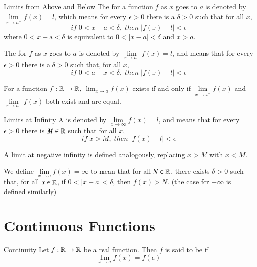\documentclass[12pt]{report}
\begin{document}
\begin{defn}{Limits from Above and Below}{}
    The  for a function $f$ as $x$ goes to $a$ is denoted by $\lim\limits_{x\rightarrow a^+}f(x) = l$, which means for every $\epsilon > 0$ there is a $\delta > 0$ such that for all $x$, $$if\;0 < x-a < \delta,\;then\;|f(x) - l|< \epsilon$$
    where $0 < x-a < \delta$ is equivalent to $0 < |x-a| < \delta$ and $x > a$.

    The  for $f$ as $x$ goes to $a$ is denoted by $\lim\limits_{x\rightarrow a^-}f(x) = l$, and means that for every $\epsilon > 0$ there is a $\delta > 0$ such that, for all $x$, $$if\;0 < a-x < \delta,\;then\;|f(x) - l| < \epsilon$$
\end{defn}


\begin{rmk}{}{}
    For a function $f:\mathbb R\rightarrow \mathbb R$, $\lim_{x\rightarrow a}f(x)$ exists if and only if $\lim\limits_{x\rightarrow a^+}f(x)$ and $\lim\limits_{x\rightarrow a^-}f(x)$ both exist and are equal.
\end{rmk}


\begin{defn}{Limits at Infinity}{}
    A  is denoted by $\lim\limits_{x\rightarrow \infty}f(x) = l$, and means that for every $\epsilon > 0$ there is $M \in \mathbb R$ such that for all $x$, $$if\;x>M,\;then\;|f(x) - l| < \epsilon$$

    A limit at negative infinity is defined analogously, replacing $x> M$ with $x < M$.
\end{defn}


\begin{defn}{}{}
    We define $\lim\limits_{x\rightarrow a}f(x) = \infty$ to mean that for all $N \in \mathbb R$, there exists $\delta > 0$ such that, for all $x \in \mathbb R$, if $0 < |x-a| < \delta$, then $f(x) > N$. (the case for $-\infty$ is defined similarly)
\end{defn}



\section{Continuous Functions}


\begin{defn}{Continuity}{}
    Let $f:\mathbb R\rightarrow \mathbb R$ be a real function. Then $f$ is said to be  if \begin{equation}
        \lim\limits_{x\rightarrow a}f(x) = f(a)
    \end{equation}
\end{defn}
\end{document}

